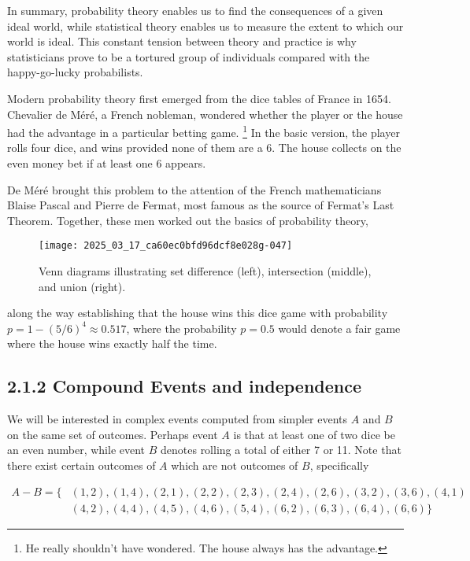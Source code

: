 \documentclass[10pt]{article}
\begin{document}
In summary, probability theory enables us to find the consequences of a given ideal world, while statistical theory enables us to measure the extent to which our world is ideal. This constant tension between theory and practice is why statisticians prove to be a tortured group of individuals compared with the happy-go-lucky probabilists.

Modern probability theory first emerged from the dice tables of France in 1654. Chevalier de Méré, a French nobleman, wondered whether the player or the house had the advantage in a particular betting game. \footnote{He really shouldn't have wondered. The house always has the advantage.} In the basic version, the player rolls four dice, and wins provided none of them are a 6. The house collects on the even money bet if at least one 6 appears.

De Méré brought this problem to the attention of the French mathematicians Blaise Pascal and Pierre de Fermat, most famous as the source of Fermat's Last Theorem. Together, these men worked out the basics of probability theory,

\begin{figure}[h]
  \centering
  \texttt{[image: 2025\_03\_17\_ca60ec0bfd96dcf8e028g-047]}
  \caption{Venn diagrams illustrating set difference (left), intersection (middle), and union (right).}
\end{figure}

along the way establishing that the house wins this dice game with probability \(p=1-(5 / 6)^{4} \approx 0.517\), where the probability \(p=0.5\) would denote a fair game where the house wins exactly half the time.

\subsection*{2.1.2 Compound Events and independence}
We will be interested in complex events computed from simpler events $A$ and $B$ on the same set of outcomes. Perhaps event $A$ is that at least one of two dice be an even number, while event $B$ denotes rolling a total of either 7 or 11. Note that there exist certain outcomes of $A$ which are not outcomes of $B$, specifically

\[
\begin{aligned}
A-B=\{ & (1,2),(1,4),(2,1),(2,2),(2,3),(2,4),(2,6),(3,2),(3,6),(4,1) \\
& (4,2),(4,4),(4,5),(4,6),(5,4),(6,2),(6,3),(6,4),(6,6)\}
\end{aligned}
\]
\end{document}
